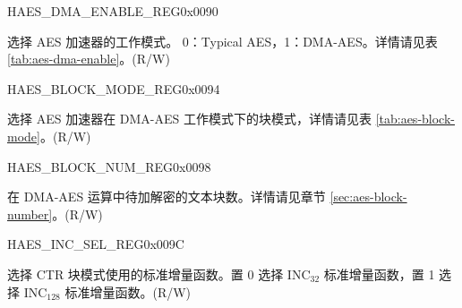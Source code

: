 \begin{register}{H}{AES\_DMA\_ENABLE\_REG}{0x0090}\label{regdesc:AESDMAENABLEREG}
%
%
\regnewline%
\begin{regdesc}\begin{reglist}
\item [AES\_DMA\_ENABLE] 选择 AES 加速器的工作模式。 0：Typical AES，1：DMA-AES。详情请见表 \ref{tab:aes-dma-enable}。(R/W)
\end{reglist}\end{regdesc}
\end{register}


\begin{register}{H}{AES\_BLOCK\_MODE\_REG}{0x0094}\label{regdesc:AESBLOCKMODEREG}
%
%
\regnewline%
\begin{regdesc}\begin{reglist}
\item [AES\_BLOCK\_MODE] 选择 AES 加速器在 DMA-AES 工作模式下的块模式，详情请见表 \ref{tab:aes-block-mode}。(R/W)
\end{reglist}\end{regdesc}
\end{register}


\begin{register}{H}{AES\_BLOCK\_NUM\_REG}{0x0098}\label{regdesc:AESBLOCKNUMREG}
%
\regnewline%
\begin{regdesc}\begin{reglist}
\item [AES\_BLOCK\_NUM] 在 DMA-AES 运算中待加解密的文本块数。详情请见章节 \ref{sec:aes-block-number}。(R/W)
\end{reglist}\end{regdesc}
\end{register}


\begin{register}{H}{AES\_INC\_SEL\_REG}{0x009C}\label{regdesc:AESINCSELREG}
%
%
\regnewline%
\begin{regdesc}\begin{reglist}
\item [AES\_INC\_SEL] 选择 CTR 块模式使用的标准增量函数。置 0 选择 INC$_{32}$ 标准增量函数，置 1 选择 INC$_{128}$ 标准增量函数。(R/W)
\end{reglist}\end{regdesc}
\end{register}

